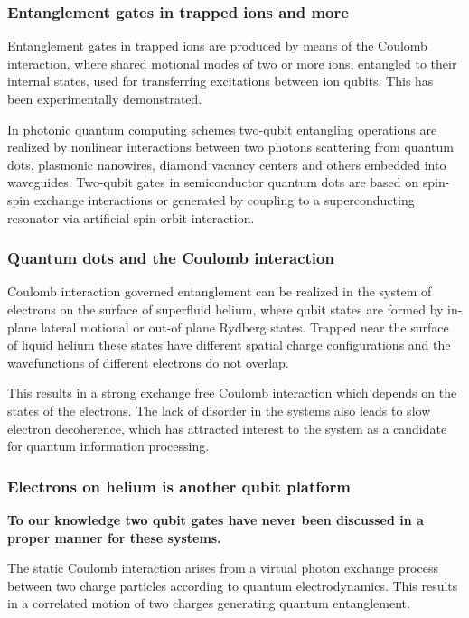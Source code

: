 \documentclass{beamer}
\begin{document}
\begin{frame}
\frametitle{Entanglement gates in trapped ions and more}

\begin{block}{}
Entanglement gates in trapped ions are
produced by means of the Coulomb interaction, where shared motional
modes of two or more ions, entangled to their internal states, used
for transferring excitations between ion
qubits. This has been experimentally
demonstrated.
\end{block}

\begin{block}{}
In photonic quantum
computing schemes two-qubit entangling operations are realized by
nonlinear interactions between two photons scattering from quantum
dots, plasmonic nanowires, diamond vacancy centers and others embedded
into waveguides. Two-qubit gates in
semiconductor quantum dots are based on spin-spin exchange
interactions or generated
by coupling to a superconducting resonator via artificial spin-orbit
interaction.
\end{block}
\end{frame}

\begin{frame}
\frametitle{Quantum dots and the Coulomb interaction}

\begin{block}{}
Coulomb interaction governed entanglement can be realized in
the system of electrons on the surface of superfluid helium, where
qubit states are formed by in-plane lateral motional or out-of plane
Rydberg states. Trapped near the surface of liquid helium these states
have different spatial charge configurations and the wavefunctions of
different electrons do not overlap.
\end{block}

\begin{block}{}
This results in a strong exchange
free Coulomb interaction which depends on the states of the
electrons. The lack of disorder in the systems
also leads to slow electron decoherence, which has attracted interest
to the system as a candidate for quantum information
processing.
\end{block}
\end{frame}

\begin{frame}
\frametitle{Electrons on helium is another qubit platform}

\textbf{To our knowledge two qubit gates have never been discussed in a proper manner for these systems.}

\begin{block}{}
The static Coulomb interaction arises from a virtual photon exchange
 process between two charge particles according to quantum
 electrodynamics. This results in a correlated motion of two charges
 generating quantum entanglement. 
\end{block}
\end{frame}
\end{document}
